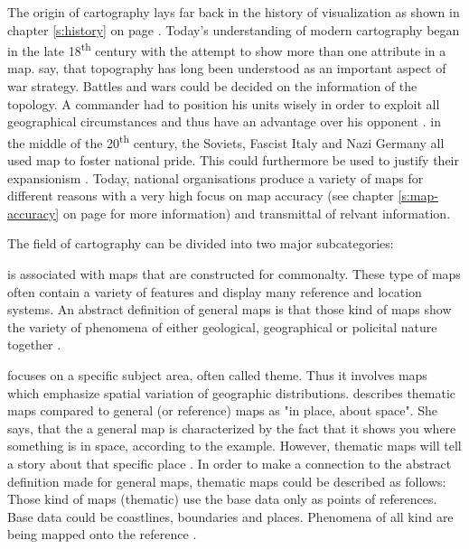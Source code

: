 The origin of cartography lays far back in the history of visualization as shown in chapter \ref{s:history} on page \pageref{s:history}. Today's understanding of modern cartography began in the late 18\textsuperscript{th} century with the attempt to show more than one attribute in a map. \citeauthor{Longley2005} say, that topography has long been understood as an important aspect of war strategy. Battles and wars could be decided on the information of the topology. A commander had to position his units wisely in order to exploit all geographical circumstances and thus have an advantage over his opponent .
in the middle of the 20\textsuperscript{th} century, the Soviets, Fascist Italy and Nazi Germany all used map to foster national pride. This could furthermore be used to justify their expansionism .
Today, national organisations produce a variety of maps for different reasons with a very high focus on map accuracy (see chapter \ref{s:map-accuracy} on page \pageref{s:map-accuracy} for more information) and transmittal of relvant information.

The field of cartography can be divided into two major subcategories:
\begin{enumerate}
 is associated with maps that are constructed for commonalty. These type of maps often contain a variety of features and display many reference and location systems. An abstract definition of general maps is that those kind of maps show the variety of phenomena of either geological, geographical or policital nature together .

 focuses on a specific subject area, often called theme. Thus it involves maps which emphasize spatial variation of geographic distributions. \citeauthor{BartzPetchenik1979} describes thematic maps compared to general (or reference) maps as "in place, about space". She says, that the a general map is characterized by the fact that it shows you where something is in space, according to the example. However, thematic maps will tell a story about that specific place .
In order to make a connection to the abstract definition \citeauthor{Thrower2008} made for general maps, thematic maps could be described as follows:
Those kind of maps (thematic) use the base data only as points of references. Base data could be coastlines, boundaries and places. Phenomena of all kind are being mapped onto the reference .
\end{enumerate}


